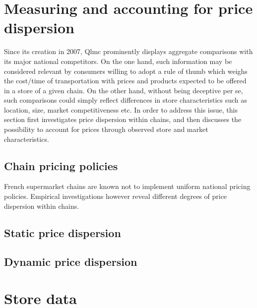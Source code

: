 \documentclass[english]{article}
\begin{document}
\section{Measuring and accounting for price dispersion}

Since its creation in 2007, Qlmc prominently displays aggregate comparisons with its major national competitors. On the one hand, such information may be considered relevant by consumers willing to adopt a rule of thumb which weighs the cost/time of transportation with prices and products expected to be offered in a store of a given chain. On the other hand, without being deceptive per se, such comparisons could simply reflect differences in store characteristics such as location, size, market competitiveness etc. In order to address this issue, this section first investigates price dispersion within chains, and then discusses the possibility to account for prices through observed store and market characteristics.

\subsection{Chain pricing policies}

French supermarket chains are known not to implement uniform national pricing policies. Empirical investigations however reveal different degrees of price dispersion within chains.

\subsection{Static price dispersion}

\subsection{Dynamic price dispersion}

\newpage



\newpage

\appendix

\section{Store data}
\end{document}
